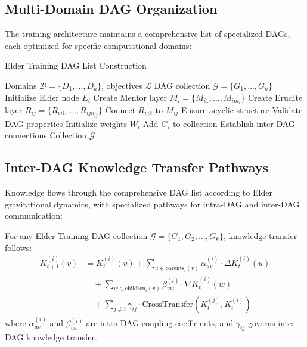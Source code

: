 \subsection{Multi-Domain DAG Organization}

The training architecture maintains a comprehensive list of specialized DAGs, each optimized for specific computational domains:

\begin{algorithm}[H]
\caption{Elder Training DAG List Construction}
\begin{algorithmic}[1]
\REQUIRE Domains $\mathcal{D} = \{D_1, \ldots, D_k\}$, objectives $\mathcal{L}$
\ENSURE DAG collection $\mathcal{G} = \{G_1, \ldots, G_k\}$
    \STATE Initialize Elder node $E_i$
    \STATE Create Mentor layer $M_i = \{M_{i1}, \ldots, M_{im_i}\}$
        \STATE Create Erudite layer $R_{ij} = \{R_{ij1}, \ldots, R_{ijn_{ij}}\}$
        \STATE Connect $R_{ijk}$ to $M_{ij}$
        \STATE Ensure acyclic structure
    \ENDFOR
    \STATE Validate DAG properties
    \STATE Initialize weights $W_i$
    \STATE Add $G_i$ to collection
\ENDFOR
\STATE Establish inter-DAG connections
\RETURN Collection $\mathcal{G}$
\end{algorithmic}
\end{algorithm}

\subsection{Inter-DAG Knowledge Transfer Pathways}

Knowledge flows through the comprehensive DAG list according to Elder gravitational dynamics, with specialized pathways for intra-DAG and inter-DAG communication:

\begin{theorem}
For any Elder Training DAG collection $\mathcal{G} = \{G_1, G_2, \ldots, G_k\}$, knowledge transfer follows:
\begin{align}
K_{t+1}^{(i)}(v) &= K_t^{(i)}(v) + \sum_{u \in \text{parents}_i(v)} \alpha_{uv}^{(i)} \cdot \Delta K_t^{(i)}(u) \\
&\quad + \sum_{w \in \text{children}_i(v)} \beta_{vw}^{(i)} \cdot \nabla K_t^{(i)}(w) \\
&\quad + \sum_{j \neq i} \gamma_{ij} \cdot \text{CrossTransfer}(K_t^{(j)}, K_t^{(i)})
\end{align}
where $\alpha_{uv}^{(i)}$ and $\beta_{vw}^{(i)}$ are intra-DAG coupling coefficients, and $\gamma_{ij}$ governs inter-DAG knowledge transfer.
\end{theorem}

